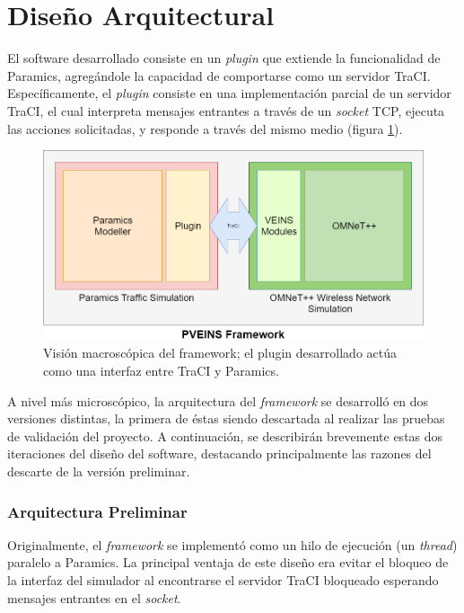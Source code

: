 \section{Diseño Arquitectural}\label{sec:architecture}

El software desarrollado consiste en un \emph{plugin} que extiende la funcionalidad de Paramics, agregándole la capacidad de comportarse como un servidor TraCI. Específicamente, el \emph{plugin} consiste en una implementación parcial de un servidor TraCI, el cual interpreta mensajes entrantes a través de un \emph{socket} TCP, ejecuta las acciones solicitadas, y responde a través del mismo medio (figura \ref{fig:pveins_genarch}).

\begin{figure}[h]
    \centering
    \includegraphics[width=\linewidth]{figuras/PVEINSArch.png}
    \caption{Visión macroscópica del framework; el plugin desarrollado actúa como una interfaz entre TraCI y Paramics.}
    \label{fig:pveins_genarch}
\end{figure}

A nivel más microscópico, la arquitectura del \emph{framework} se desarrolló en dos versiones distintas, la primera de éstas siendo descartada al realizar las pruebas de validación del proyecto. A continuación, se describirán brevemente estas dos iteraciones del diseño del software, destacando principalmente las razones del descarte de la versión preliminar.

\subsubsection{Arquitectura Preliminar}

Originalmente, el \emph{framework} se implementó como un hilo de ejecución (un \emph{thread}) paralelo a Paramics. La principal ventaja de este diseño era evitar el bloqueo de la interfaz del simulador al encontrarse el servidor TraCI bloqueado esperando mensajes entrantes en el \emph{socket}. 

